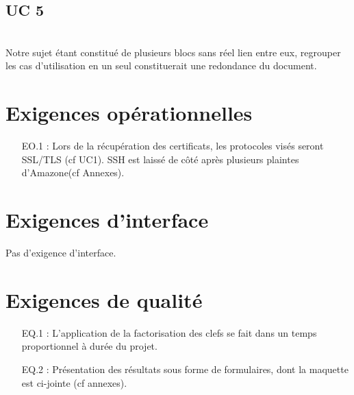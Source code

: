 \documentclass[a4paper,11pt,french]{article}
\begin{document}
\subsection{UC 5}

\medskip\\
Notre sujet étant constitué de plusieurs blocs sans réel lien entre eux, regrouper les cas d'utilisation en un seul constituerait une redondance du document.

\section{Exigences opérationnelles}
\begin{enumerate}
	\item [EO.1] : Lors de la récupération des certificats, les protocoles visés seront SSL/TLS (cf UC1). SSH est laissé de côté après plusieurs plaintes d'Amazone(cf Annexes).
\end{enumerate}


\section{Exigences d'interface}
Pas d'exigence d'interface.

\section{Exigences de qualité}
\begin{enumerate}
	\item [EQ.1] : L'application de la factorisation des clefs se fait dans un temps proportionnel à durée du projet.
	\item [EQ.2] : Présentation des résultats sous forme de formulaires, dont la maquette est ci-jointe (cf annexes).
\end{enumerate}
\end{document}
